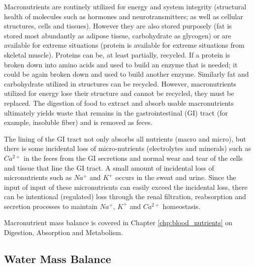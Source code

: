 Macronutrients are routinely utilized for energy and system integrity (structural health of molecules such as hormones and neurotransmitters; as well as cellular structures, cells and tissues). However they are also stored purposely (fat is stored most abundantly as adipose tissue, carbohydrate as glycogen) or are available for extreme situations (protein is available for extreme situations from skeletal muscle). Proteins can be, at least partially, recycled. If a protein is broken down into amino acids and used to build an enzyme that is needed; it could be again broken down and used to build another enzyme. Similarly fat and carbohydrate utilized in structures can be recycled. However, macronutrients utilized for energy lose their structure and cannot be recycled, they must be replaced. The digestion of food to extract and absorb usable macronutrients\footnotemark{} ultimately yields waste that remains in the gastrointestinal (GI) tract (for example, insoluble fiber) and is removed as feces. 

The lining of the GI tract not only absorbs all nutrients (macro and micro), but there is some incidental loss of micro-nutrients (electrolytes and minerals) such as $Ca^{2+}$ in the feces from the GI secretions and normal wear and tear of the cells and tissue that line the GI tract. A small amount of incidental loss of micronutrients such as $Na^+$ and $K^+$ occurs in the sweat and urine. Since the input of input of these micronutrients can easily exceed the incidental loss, there can be intentional (regulated) loss through the renal filtration, reabsorption and secretion processes to maintain $Na^+$, $K^+$ and $Ca^{2+}$ homeostasis.

Macronutrient mass balance is covered in Chapter \ref{chp:blood_nutrients} on Digestion, Absorption and Metabolism.

\subsection{Water Mass Balance}

